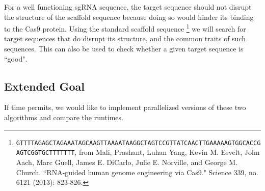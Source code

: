 \documentclass[11pt,a4paper]{article}
\begin{document}
For a well functioning sgRNA sequence, the target sequence should not disrupt the structure of the scaffold sequence because doing so would hinder its binding to the Cas9 protein. Using the standard scaffold sequence \footnote{\tiny\texttt{GTTTTAGAGCTAGAAATAGCAAGTTAAAATAAGGCTAGTCCGTTATCAACTTGAAAAAGTGGCACCGAGTCGGTGCTTTTTTT}, from Mali, Prashant, Luhan Yang, Kevin M. Esvelt, John Aach, Marc Guell, James E. DiCarlo, Julie E. Norville, and George M. Church. ``RNA-guided human genome engineering via Cas9." Science 339, no. 6121 (2013): 823-826.} %
we will search for target sequences that do disrupt its structure, and the common traits of such sequences. This can also be used to check whether a given target sequence is ``good".%


\subsection{Extended Goal}
If time permits, we would like to implement parallelized versions of these two algorithms and compare the runtimes.


\iffalse
\begin{thebibliography}{5}
\bibitem{4rus} Venkatachalam, Balaji, Dan Gusfield, and Yelena Frid. ``Faster algorithms for RNA-folding using the Four-Russians method." Algorithms for Molecular Biology 9, no. 1 (2014): 5.
\bibitem{Nussinov}  Nussinov, Ruth, George Pieczenik, Jerrold R. Griggs, and Daniel J. Kleitman. ``Algorithms for loop matchings." SIAM Journal on Applied mathematics 35, no. 1 (1978): 68-82.
\bibitem{scaffold} Mali, Prashant, Luhan Yang, Kevin M. Esvelt, John Aach, Marc Guell, James E. DiCarlo, Julie E. Norville, and George M. Church. ``RNA-guided human genome engineering via Cas9." Science 339, no. 6121 (2013): 823-826.
\end{thebibliography}
\fi
\end{document}
